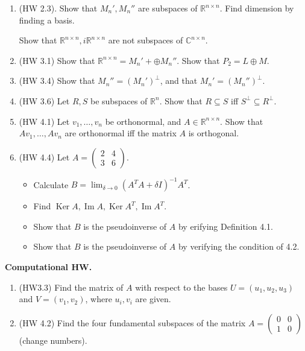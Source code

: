 \documentclass{article}
\newcommand{\mat}[1]{\begin{pmatrix}#1\end{pmatrix}}
\newcommand{\RR}{\mathbb{R}}
\newcommand{\CC}{\mathbb{C}}
\DeclareMathOperator{\Ker}{Ker}
\DeclareMathOperator{\Ima}{Im}
\DeclareMathOperator{\Ima}{Im}
\begin{document}
\begin{enumerate}
  \item  (HW 2.3). Show that $M_n', M_n''$ are subspaces of $\RR^{n \times n}$.  Find dimension by finding a basis.

    Show that $\RR^{n \times n}, i \RR^{n \times n}$ are not subspaces of $\CC^{n \times n}$.


  \item (HW 3.1) Show that $\RR^{n \times n} = M_n' + \oplus M_n''$.  Show that $P_2 = L \oplus M$.

  \item (HW 3.4) Show that $M_n'' = (M_n')^{\perp}$, and that $M_n' = (M_n'')^{\perp}$.

  \item (HW 3.6) Let $R, S$ be subspaces of $\RR^n$.  Show that $R \subseteq S$ iff $S^{\perp} \subseteq R^{\perp}$.

  \item (HW 4.1) Let $v_1, \dots, v_n$ be orthonormal, and $A \in \RR^{n \times n}$.  Show that $Av_1, \dots, A v_n$ are orthonormal iff the matrix $A$ is orthogonal.

  \item (HW 4.4) Let $A = \mat{2 & 4 \\ 3 & 6}$.  

    \begin{itemize}
      \item Calculate $B = \lim_{\delta \to 0} (A^T A + \delta I)^{-1} A^T$.
      \item Find $\Ker A, \Ima A, \Ker A^T, \Ima A^T$.
      \item Show that $B$ is the pseudoinverse of $A$ by erifying Definition 4.1.
      \item Show that $B$ is the pseudoinverse of $A$ by verifying the condition of 4.2.
    \end{itemize} 
\end{enumerate}

{\bf Computational HW.}

\begin{enumerate}
  \item (HW3.3) Find the matrix of $A$ with respect to the bases $U = (u_1, u_2, u_3)$ and $V =(v_1, v_2)$, where $u_i, v_i$ are given.

  \item (HW 4.2) Find the four fundamental subspaces of the matrix $A = \mat{0 & 0 \\ 1 & 0}$ (change numbers).
\end{enumerate}
\end{document}
